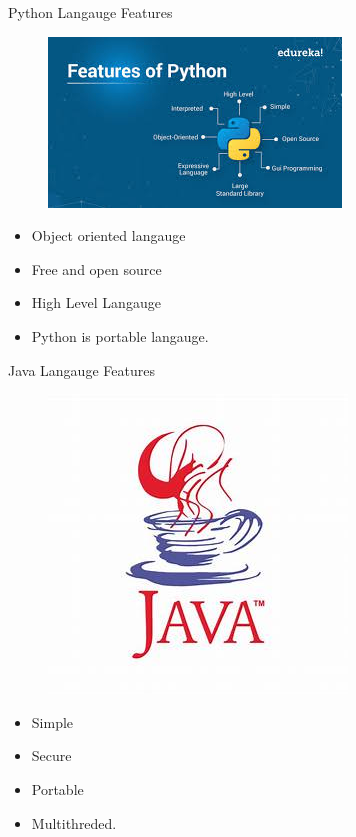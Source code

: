 \documentclass[compress,red,12pt]{beamer}
\begin{document}
\begin{frame}{ Python Langauge Features}\pause
\begin{figure}
    \hfill
    \includegraphics[totalheight=1.0in]{python.jpg}
    
\end{figure}
\begin{itemize}

    \item \large Object oriented langauge\pause
    \item \large Free and open source\pause
    \item \large High Level Langauge\pause
    \item  \large Python is portable langauge.\pause
\end{itemize}
\end{frame}


\begin{frame}{ Java Langauge Features}\pause
\begin{figure}
    \hfill
    \includegraphics[totalheight=1.0in]{java.jpg}
    
\end{figure}
\begin{itemize}

    \item \large Simple\pause
    \item \large Secure\pause
    \item \large Portable\pause
    \item  \large Multithreded.\pause
\end{itemize}
\end{frame}
\end{document}
